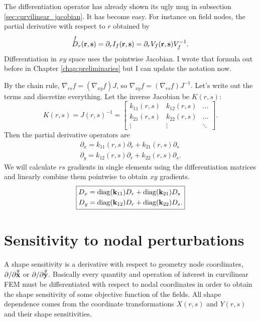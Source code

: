 The differentiation operator has already shown its ugly mug in subsection \ref{sec:curvilinear_jacobian}.  It has become easy.  For instance on field nodes, the partial derivative with respect to $r$ obtained by
%
\begin{equation}
\overset{f}{D}_r(\textbf{r}, \textbf{s}) = \partial_r I_f(\textbf{r}, \textbf{s}) = \partial_r V_f(\textbf{r}, \textbf{s}) V_f^{-1}.
\end{equation}
%
Differentiation in $xy$ space uses the pointwise Jacobian.  I wrote that formula out before in Chapter \ref{chap:preliminaries} but I can update the notation now.

By the chain rule, $\nabla_{rs} f = (\nabla_{xy}f)J$, so $\nabla_{xy}f = (\nabla_{rs} f) J^{-1}$.  Let's write out the terms and discretize everything.  Let the inverse Jacobian be $K(r,s)$:
%
\begin{equation}
K(r,s) = J(r,s)^{-1} = \begin{bmatrix}
k_{11}(r,s) & k_{12}(r,s) & \hdots \\
k_{21}(r,s) & k_{22}(r,s) & \hdots \\
\vdots & \vdots & \ddots
\end{bmatrix}.
\end{equation}
%
Then the partial derivative operators are
%
\begin{equation}
\begin{aligned}
\partial_x = k_{11}(r,s) \partial_r + k_{21}(r,s) \partial_s \\
\partial_y = k_{12}(r,s) \partial_r + k_{22}(r,s) \partial_s.
\end{aligned}
\end{equation}
%
We will calculate $rs$ gradients in single elements using the differentiation matrices and linearly combine them pointwise to obtain $xy$ gradients.
%
\begin{equation}
\boxed{
\begin{aligned}
D_x &= \mathrm{diag}(\textbf{k}_{11}) D_r + \mathrm{diag}(\textbf{k}_{21}) D_s \\
D_y &= \mathrm{diag}(\textbf{k}_{12}) D_r + \mathrm{diag}(\textbf{k}_{22}) D_s .
\end{aligned}
}
\end{equation}

\section{Sensitivity to nodal perturbations}

A shape sensitivity is a derivative with respect to geometry node coordinates, $\partial/\partial \overset{g}{\textbf{x}}$ or $\partial/\partial \overset{g}{\textbf{y}}$.  Basically every quantity and operation of interest in curvilinear FEM must be differentiated with respect to nodal coordinates in order to obtain the shape sensitivity of some objective function of the fields.  All shape dependence comes from the coordinate transformations $X(r,s)$ and $Y(r,s)$ and their shape sensitivities.

